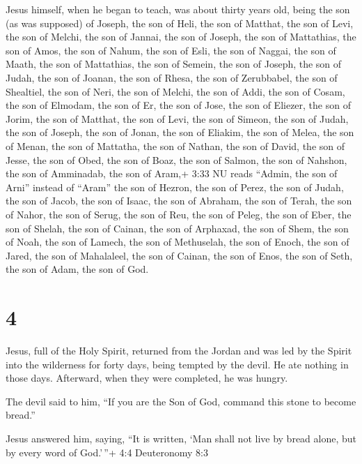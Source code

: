  Jesus himself, when he began to teach, was about thirty
years old, being the son (as was supposed) of Joseph, the son of Heli,
 the son of Matthat, the son of Levi, the son of Melchi,
the son of Jannai, the son of Joseph,  the son of
Mattathias, the son of Amos, the son of Nahum, the son of Esli, the son
of Naggai,  the son of Maath, the son of Mattathias, the
son of Semein, the son of Joseph, the son of Judah,  the
son of Joanan, the son of Rhesa, the son of Zerubbabel, the son of
Shealtiel, the son of Neri,  the son of Melchi, the son of
Addi, the son of Cosam, the son of Elmodam, the son of Er, 
the son of Jose, the son of Eliezer, the son of Jorim, the son of
Matthat, the son of Levi,  the son of Simeon, the son of
Judah, the son of Joseph, the son of Jonan, the son of Eliakim,
 the son of Melea, the son of Menan, the son of Mattatha,
the son of Nathan, the son of David,  the son of Jesse, the
son of Obed, the son of Boaz, the son of Salmon, the son of Nahshon,
 the son of Amminadab, the son of Aram,+ 3:33 NU reads
``Admin, the son of Arni'' instead of ``Aram'' the son of Hezron, the
son of Perez, the son of Judah,  the son of Jacob, the son
of Isaac, the son of Abraham, the son of Terah, the son of Nahor,
 the son of Serug, the son of Reu, the son of Peleg, the
son of Eber, the son of Shelah,  the son of Cainan, the son
of Arphaxad, the son of Shem, the son of Noah, the son of Lamech,
 the son of Methuselah, the son of Enoch, the son of Jared,
the son of Mahalaleel, the son of Cainan,  the son of Enos,
the son of Seth, the son of Adam, the son of God.

\hypertarget{section-3}{%
\section{4}\label{section-3}}

 Jesus, full of the Holy Spirit, returned from the Jordan
and was led by the Spirit into the wilderness  for forty
days, being tempted by the devil. He ate nothing in those days.
Afterward, when they were completed, he was hungry.

 The devil said to him, ``If you are the Son of God, command
this stone to become bread.''

 Jesus answered him, saying, ``It is written, `Man shall not
live by bread alone, but by every word of God.'\,''+ 4:4 Deuteronomy 8:3

